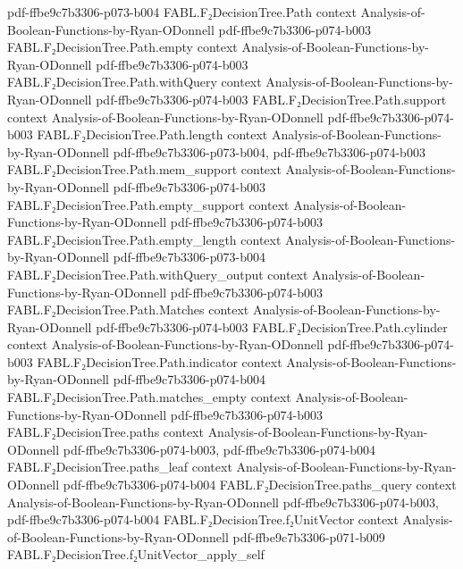 \begin{theorem}
  {pdf-ffbe9c7b3306-p073-b004}
\proofstep
  {FABL.F₂DecisionTree.Path}
  {context}
  {Analysis-of-Boolean-Functions-by-Ryan-ODonnell}
  {pdf-ffbe9c7b3306-p074-b003}
\proofstep
  {FABL.F₂DecisionTree.Path.empty}
  {context}
  {Analysis-of-Boolean-Functions-by-Ryan-ODonnell}
  {pdf-ffbe9c7b3306-p074-b003}
\proofstep
  {FABL.F₂DecisionTree.Path.withQuery}
  {context}
  {Analysis-of-Boolean-Functions-by-Ryan-ODonnell}
  {pdf-ffbe9c7b3306-p074-b003}
\proofstep
  {FABL.F₂DecisionTree.Path.support}
  {context}
  {Analysis-of-Boolean-Functions-by-Ryan-ODonnell}
  {pdf-ffbe9c7b3306-p074-b003}
\proofstep
  {FABL.F₂DecisionTree.Path.length}
  {context}
  {Analysis-of-Boolean-Functions-by-Ryan-ODonnell}
  {pdf-ffbe9c7b3306-p073-b004,
    pdf-ffbe9c7b3306-p074-b003}
\proofstep
  {FABL.F₂DecisionTree.Path.mem_support}
  {context}
  {Analysis-of-Boolean-Functions-by-Ryan-ODonnell}
  {pdf-ffbe9c7b3306-p074-b003}
\proofstep
  {FABL.F₂DecisionTree.Path.empty_support}
  {context}
  {Analysis-of-Boolean-Functions-by-Ryan-ODonnell}
  {pdf-ffbe9c7b3306-p074-b003}
\proofstep
  {FABL.F₂DecisionTree.Path.empty_length}
  {context}
  {Analysis-of-Boolean-Functions-by-Ryan-ODonnell}
  {pdf-ffbe9c7b3306-p073-b004}
\proofstep
  {FABL.F₂DecisionTree.Path.withQuery_output}
  {context}
  {Analysis-of-Boolean-Functions-by-Ryan-ODonnell}
  {pdf-ffbe9c7b3306-p074-b003}
\proofstep
  {FABL.F₂DecisionTree.Path.Matches}
  {context}
  {Analysis-of-Boolean-Functions-by-Ryan-ODonnell}
  {pdf-ffbe9c7b3306-p074-b003}
\proofstep
  {FABL.F₂DecisionTree.Path.cylinder}
  {context}
  {Analysis-of-Boolean-Functions-by-Ryan-ODonnell}
  {pdf-ffbe9c7b3306-p074-b003}
\proofstep
  {FABL.F₂DecisionTree.Path.indicator}
  {context}
  {Analysis-of-Boolean-Functions-by-Ryan-ODonnell}
  {pdf-ffbe9c7b3306-p074-b004}
\proofstep
  {FABL.F₂DecisionTree.Path.matches_empty}
  {context}
  {Analysis-of-Boolean-Functions-by-Ryan-ODonnell}
  {pdf-ffbe9c7b3306-p074-b003}
\proofstep
  {FABL.F₂DecisionTree.paths}
  {context}
  {Analysis-of-Boolean-Functions-by-Ryan-ODonnell}
  {pdf-ffbe9c7b3306-p074-b003,
    pdf-ffbe9c7b3306-p074-b004}
\proofstep
  {FABL.F₂DecisionTree.paths_leaf}
  {context}
  {Analysis-of-Boolean-Functions-by-Ryan-ODonnell}
  {pdf-ffbe9c7b3306-p074-b004}
\proofstep
  {FABL.F₂DecisionTree.paths_query}
  {context}
  {Analysis-of-Boolean-Functions-by-Ryan-ODonnell}
  {pdf-ffbe9c7b3306-p074-b003,
    pdf-ffbe9c7b3306-p074-b004}
\proofstep
  {FABL.F₂DecisionTree.f₂UnitVector}
  {context}
  {Analysis-of-Boolean-Functions-by-Ryan-ODonnell}
  {pdf-ffbe9c7b3306-p071-b009}
\proofstep
  {FABL.F₂DecisionTree.f₂UnitVector_apply_self}

\end{theorem}
